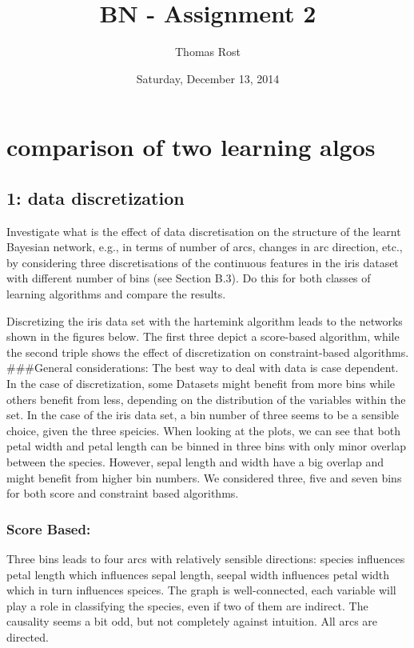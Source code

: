 \documentclass[]{article}
\title{BN - Assignment 2}
\author{Thomas Rost}
\date{Saturday, December 13, 2014}
\begin{document}
\maketitle


{
\hypersetup{linkcolor=black}
\setcounter{tocdepth}{2}
\tableofcontents
}
\newpage

\section{comparison of two learning
algos}\label{comparison-of-two-learning-algos}

\subsection{1: data discretization}\label{data-discretization}

Investigate what is the effect of data discretisation on the structure
of the learnt Bayesian network, e.g., in terms of number of arcs,
changes in arc direction, etc., by considering three discretisations of
the continuous features in the iris dataset with different number of
bins (see Section B.3). Do this for both classes of learning algorithms
and compare the results.

Discretizing the iris data set with the hartemink algorithm leads to the
networks shown in the figures below. The first three depict a
score-based algorithm, while the second triple shows the effect of
discretization on constraint-based algorithms. \#\#\#General
considerations: The best way to deal with data is case dependent. In the
case of discretization, some Datasets might benefit from more bins while
others benefit from less, depending on the distribution of the variables
within the set. In the case of the iris data set, a bin number of three
seems to be a sensible choice, given the three speicies. When looking at
the plots, we can see that both petal width and petal length can be
binned in three bins with only minor overlap between the species.
However, sepal length and width have a big overlap and might benefit
from higher bin numbers. We considered three, five and seven bins for
both score and constraint based algorithms.

\subsubsection{Score Based:}\label{score-based}

Three bins leads to four arcs with relatively sensible directions:
species influences petal length which influences sepal length, seepal
width influences petal width which in turn influences speices. The graph
is well-connected, each variable will play a role in classifying the
species, even if two of them are indirect. The causality seems a bit
odd, but not completely against intuition. All arcs are directed.
\end{document}
